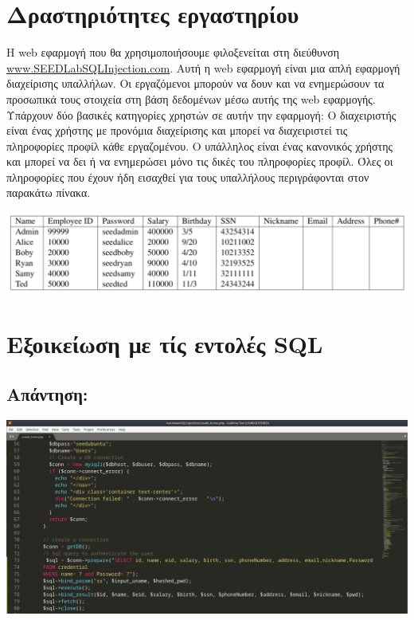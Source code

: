 %
%
\setcounter{section}{0}
\section*{Δραστηριότητες εργαστηρίου}


\noindent
Η web εφαρμογή που θα χρησιμοποιήσουμε φιλοξενείται στη διεύθυνση
\url{www.SEEDLabSQLInjection.com}. Αυτή η web εφαρμογή είναι μια απλή
εφαρμογή διαχείρισης υπαλλήλων. Οι εργαζόμενοι μπορούν να δουν και να
ενημερώσουν τα προσωπικά τους στοιχεία στη βάση δεδομένων μέσω αυτής της
web εφαρμογής. Υπάρχουν δύο βασικές κατηγορίες χρηστών σε αυτήν την
εφαρμογή: Ο διαχειριστής είναι ένας χρήστης με προνόμια διαχείρισης και μπορεί
να διαχειριστεί τις πληροφορίες προφίλ κάθε εργαζομένου. Ο υπάλληλος είναι ένας
κανονικός χρήστης και μπορεί να δει ή να ενημερώσει μόνο τις δικές του
πληροφορίες προφίλ. Όλες οι πληροφορίες που έχουν ήδη εισαχθεί για τους
υπαλλήλους περιγράφονται στον παρακάτω πίνακα.

\begin{center}
			\includegraphics[width=1\textwidth]{image/table1.PNG}		
\end{center}

\section{Εξοικείωση με τίς εντολές SQL}

\subsection*{Απάντηση:}

\begin{center}
			\includegraphics[width=1\textwidth]{image/4.2.PNG}		
\end{center}

